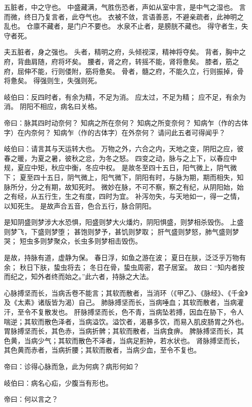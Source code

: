 \documentclass{article}%
\begin{document}
五脏者，中之守也。
中盛藏满，气胜伤恐者，声如从室中言，是中气之湿也。
言而微，终日乃复言者，此夺气也。
衣被不敛，言语善恶，不避亲疏者，此神明之乱也。
仓廪不藏者，是门户不要也。
水泉不止者，是膀胱不藏也。
得守者生，失守者死。

夫五脏者，身之强也。
头者，精明之府，头倾视深，精神将夺矣。
背者，胸中之府，背曲肩随，府将坏矣。
腰者，肾之府，转摇不能，肾将惫矣。
膝者，筋之府，屈伸不能，行则偻附，筋将惫矣。
骨者，髓之府，不能久立，行则振掉，骨将惫矣。
得强则生，失强则死。

岐伯曰：反四时者，有余为精，不足为消。
应太过，不足为精；
应不足，有余为消。
阴阳不相应，病名曰关格。

帝曰：脉其四时动奈何？
知病之所在奈何？
知病之所变奈何？
知病乍（作的古体字）在内奈何？
知病乍（作的古体字）在外奈何？
请问此五者可得闻乎？

岐伯曰：请言其与天运转大也。
万物之外，六合之内，天地之变，阴阳之应，彼春之暖，为夏之暑，彼秋之忿，为冬之怒。
四变之动，脉与之上下，以春应中规，夏应中矩，秋应中衡，冬应中权。
是故冬至四十五日，阳气微上，阴气微下；
夏至四十五日，阴气微上，阳气微下，阴阳有时，与脉为期，期而相失，知脉所分，分之有期，故知死时。
微妙在脉，不可不察，察之有纪，从阴阳始，始之有经，从五行生，生之有度，四时为宜。
补泻勿失，与天地如一，得一之情，以知死生。
是故声合五音，色合五行，脉合阴阳。

是知阴盛则梦涉大水恐惧，阳盛则梦大火燔灼，阴阳惧盛，则梦相杀毁伤。
上盛则梦飞，下盛则梦堕；
甚饱则梦予，甚饥则梦取；
肝气盛则梦怒，肺气盛则梦哭；
短虫多则梦聚众，长虫多则梦相击毁伤。

是故，持脉有道，虚静为保。
春日浮，如鱼之游在波；
夏日在肤，泛泛乎万物有余；
秋日下肤，蛰虫将去；
冬日在骨，蛰虫周密，君子居室。
故曰：“知内者按而纪之，知外者终而始之。”此六者，持脉之大法。

心脉搏坚而长，当病舌卷不能言；其软而散者，当消环（《甲乙》、《脉经》、《千金》及《太素》诸版皆为渴）自己。
肺脉搏坚而长，当病唾血；其软而散者，当病灌汗，至令不复散发也。
肝脉搏坚而长，色不青，当病坠若搏，因血在胁下，令人喘逆；其软而散色泽者，当病溢饮。溢饮者，渴暴多饮，而易入肌皮肠胃之外也。
胃脉搏坚而长，其色赤，当病折髀；其软而散者，当病食痹。
脾脉搏坚而长，其色黄，当病少气；其软而散色不泽者，当病足胻肿，若水状也。
肾脉搏坚而长，其色黄而赤者，当病折腰；其软而散者，当病少血，至令不复也。

帝曰：诊得心脉而急，此为何病？病形何如？

岐伯曰：病名心疝，少腹当有形也。

帝曰：何以言之？
\end{document}
